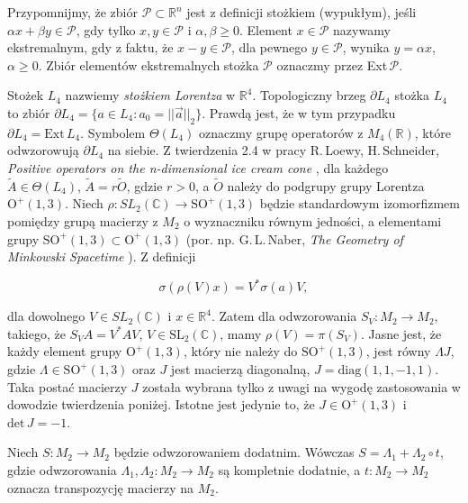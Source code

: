 Przypomnijmy, że zbiór $\mathcal{P} \subset \mathbb{R}^{n}$
jest z definicji stożkiem (wypukłym), jeśli
$\alpha x + \beta y \in \mathcal{P}$,
gdy tylko $x, y \in \mathcal{P}$ i $\alpha, \beta \geq 0$.
Element $x \in \mathcal{P}$ nazywamy ekstremalnym, gdy
z faktu, że $x - y \in \mathcal{P}$,
dla pewnego $y \in \mathcal{P}$,
wynika $y = \alpha x$, $\alpha \geq 0$.
Zbiór elementów ekstremalnych stożka $\mathcal{P}$ oznaczmy przez
Ext\,$\mathcal{P}$.

Stożek $L_{4}$ nazwiemy \emph{stożkiem Lorentza} w $\mathbb{R}^{4}$.
Topologiczny brzeg $\partial L_{4}$ stożka $L_{4}$ to zbiór
$\partial L_{4} = \{ a \in L_{4} : a_{0} = || \vec{a} ||_{2} \}$.
Prawdą jest, że w tym przypadku $\partial L_{4} = \text{Ext}\,L_{4}$.
Symbolem $\Theta(L_{4})$ oznaczmy grupę operatorów z $M_{4}(\mathbb{R})$,
które odwzorowują $\partial L_{4}$ na siebie.
Z twierdzenia 2.4 w pracy
R.\,Loewy, H.\,Schneider,
\emph{Positive operators on the n-dimensional ice cream cone}
\cite{loewy1975positive},
dla każdego $\tilde{A} \in \Theta(L_{4})$,
$\tilde{A} = r \tilde{O}$,
gdzie $r > 0$, a $\tilde{O}$ należy do
podgrupy grupy Lorentza $\mathrm{O}^{+}(1,3)$.
Niech $\rho: SL_{2}(\mathbb{C}) \rightarrow \text{SO}^{+}(1,3)$
będzie standardowym izomorfizmem pomiędzy grupą macierzy z $M_{2}$
o wyznaczniku równym jedności, a elementami grupy $\text{SO}^{+}(1,3) \subset \text{O}^{+}(1,3)$
(por. np. G.\,L.\,Naber, \emph{The Geometry of Minkowski Spacetime}
\cite{Naber1992}).
Z definicji
\begin{linenomath*}
 \begin{equation}
\sigma(\rho(V) x) = V^{*} \sigma(a) V,
 \end{equation}
\end{linenomath*}
dla dowolnego $V \in SL_{2}(\mathbb{C})$ i $x \in \mathbb{R}^{4}$.
Zatem dla odwzorowania $S_{V}: M_{2} \rightarrow M_{2}$,
takiego, że $S_{V} A = V^{*} A V$, $V \in \text{SL}_{2}(\mathbb{C})$,
mamy $\rho(V) = \pi(S_{V})$.
Jasne jest, że każdy element grupy $\text{O}^{+}(1,3)$,
który nie należy do  $\text{SO}^{+}(1,3)$,
jest równy $\Lambda J$,
gdzie $\Lambda \in \text{SO}^{+}(1,3)$ oraz $J$ jest macierzą diagonalną,
$J = \mathrm{diag}(1,1,-1,1)$.
Taka postać macierzy $J$ została wybrana tylko z uwagi na wygodę zastosowania
w dowodzie twierdzenia poniżej.
Istotne jest jedynie to, że
$J \in \text{O}^{+}(1,3)$ i $\mathrm{det} \, J = -1$.

\begin{Theorem}
\label{thm:PositiveMapsOnM2}
    Niech $S:M_{2} \rightarrow M_{2}$ będzie odwzorowaniem dodatnim.
    Wówczas $S = \Lambda_{1}  + \Lambda_{2} \circ t$,
    gdzie odwzorowania
    $\Lambda_{1}, \Lambda_{2}:M_{2} \rightarrow M_{2}$
    są kompletnie dodatnie, a
    $t: M_{2} \rightarrow M_{2}$ oznacza transpozycję macierzy na $M_{2}$.
\end{Theorem}

